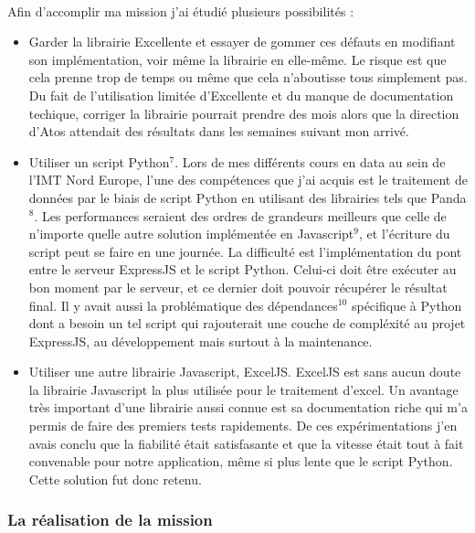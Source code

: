 \documentclass[12pt]{article}
\begin{document}
\begin {sloppypar}
\paragraph {}
Afin d'accomplir ma mission j'ai étudié plusieurs possibilités : 
\begin{itemize}
  \item 
    Garder la librairie Excellente et essayer de gommer ces défauts en modifiant
    son implémentation, voir même la librairie en elle-même. 
    Le risque est que cela prenne trop de temps ou même que cela n'aboutisse tous 
    simplement pas. Du fait de l'utilisation limitée d'Excellente et du manque de documentation 
    techique, corriger la librairie pourrait prendre des mois alors que la direction d'Atos 
    attendait des résultats dans les semaines suivant mon arrivé.
  \item 
    Utiliser un script Python$^{7}$. Lors de mes différents cours en data au sein de l'IMT Nord 
    Europe, l'une des compétences que j'ai acquis est le traitement de données par le biais 
    de script Python en utilisant des librairies tels que Panda$^{8}$. Les performances 
    seraient des ordres de grandeurs meilleurs que celle de n'importe quelle autre solution 
    implémentée en Javascript$^{9}$, et l'écriture du script peut se faire en une journée. 
    La difficulté est l'implémentation du pont entre le serveur ExpressJS et le script Python. 
    Celui-ci doit être exécuter au bon moment par le serveur, et ce dernier doit pouvoir 
    récupérer le résultat final. Il y avait aussi la problématique des dépendances$^{10}$ spécifique
    à Python dont a besoin un tel script qui rajouterait une couche de compléxité au projet ExpressJS, au 
    développement mais surtout à la maintenance.
  \item 
    Utiliser une autre librairie Javascript, ExcelJS. ExcelJS est sans aucun doute 
    la librairie Javascript la plus utilisée pour le traitement d'excel. Un avantage très important 
    d'une librairie aussi connue est sa documentation riche qui m'a permis de faire des premiers 
    tests rapidements. De ces expérimentations j'en avais conclu que la fiabilité était 
    satisfasante et que la vitesse était tout à fait convenable pour notre application, même si 
    plus lente que le script Python. Cette solution fut donc retenu.
\end{itemize}
\newpage
\subsubsection{La réalisation de la mission}

\end{sloppypar}
\end{document}
